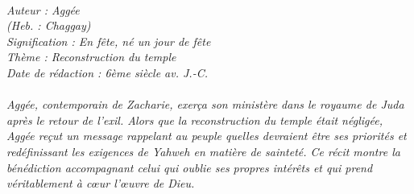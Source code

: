 \BFont
\noindent\hrulefill
{\footnotesize
\textit{
\bigskip
{\centering{}
\\Auteur : Aggée
\\(Heb. : Chaggay)
\\Signification : En fête, né un jour de fête
\\Thème : Reconstruction du temple
\\Date de rédaction : 6ème siècle av. J.-C.\\}
}
\textit{
\\Aggée, contemporain de Zacharie, exerça son ministère dans le royaume de Juda après le retour de l’exil. Alors que la reconstruction du temple était négligée, Aggée reçut un message rappelant au peuple quelles devraient être ses priorités et redéfinissant les exigences de Yahweh en matière de sainteté. Ce récit montre la bénédiction accompagnant celui qui oublie ses propres intérêts et qui prend véritablement à cœur l’œuvre de Dieu.\bigskip
}
}
\par\nobreak\noindent\hrulefill
